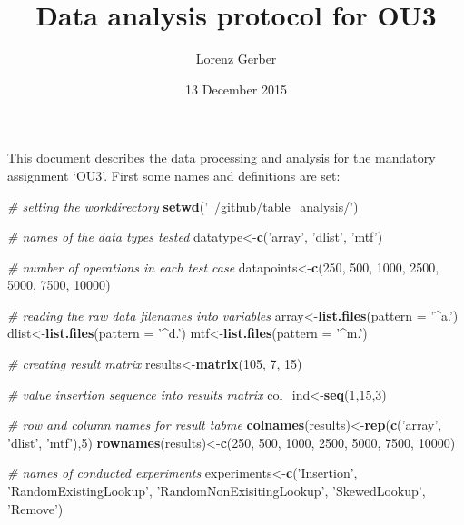 \documentclass[]{article}
\title{Data analysis protocol for OU3}
\author{Lorenz Gerber}
\date{13 December 2015}
\newenvironment{Shaded}{\begin{snugshade}}{\end{snugshade}}
\newcommand{\KeywordTok}[1]{\textcolor[rgb]{0.13,0.29,0.53}{\textbf{{#1}}}}
\newcommand{\DataTypeTok}[1]{\textcolor[rgb]{0.13,0.29,0.53}{{#1}}}
\newcommand{\DecValTok}[1]{\textcolor[rgb]{0.00,0.00,0.81}{{#1}}}
\newcommand{\StringTok}[1]{\textcolor[rgb]{0.31,0.60,0.02}{{#1}}}
\newcommand{\CommentTok}[1]{\textcolor[rgb]{0.56,0.35,0.01}{\textit{{#1}}}}
\newcommand{\NormalTok}[1]{{#1}}
\begin{document}
\maketitle


This document describes the data processing and analysis for the
mandatory assignment `OU3'. First some names and definitions are set:

\begin{Shaded}
\begin{Highlighting}[]
\CommentTok{# setting the workdirectory}
\KeywordTok{setwd}\NormalTok{(}\StringTok{'~/github/table_analysis/'}\NormalTok{)}

\CommentTok{# names of the data types tested}
\NormalTok{datatype<-}\KeywordTok{c}\NormalTok{(}\StringTok{'array'}\NormalTok{, }\StringTok{'dlist'}\NormalTok{, }\StringTok{'mtf'}\NormalTok{)}

\CommentTok{# number of operations in each test case}
\NormalTok{datapoints<-}\KeywordTok{c}\NormalTok{(}\DecValTok{250}\NormalTok{, }\DecValTok{500}\NormalTok{, }\DecValTok{1000}\NormalTok{, }\DecValTok{2500}\NormalTok{, }\DecValTok{5000}\NormalTok{, }\DecValTok{7500}\NormalTok{, }\DecValTok{10000}\NormalTok{)}

\CommentTok{# reading the raw data filenames into variables}
\NormalTok{array<-}\KeywordTok{list.files}\NormalTok{(}\DataTypeTok{pattern =} \StringTok{'^a.'}\NormalTok{)}
\NormalTok{dlist<-}\KeywordTok{list.files}\NormalTok{(}\DataTypeTok{pattern =} \StringTok{'^d.'}\NormalTok{)}
\NormalTok{mtf<-}\KeywordTok{list.files}\NormalTok{(}\DataTypeTok{pattern =} \StringTok{'^m.'}\NormalTok{)}

\CommentTok{# creating result matrix}
\NormalTok{results<-}\KeywordTok{matrix}\NormalTok{(}\DecValTok{105}\NormalTok{, }\DecValTok{7}\NormalTok{, }\DecValTok{15}\NormalTok{)}

\CommentTok{# value insertion sequence into results matrix}
\NormalTok{col_ind<-}\KeywordTok{seq}\NormalTok{(}\DecValTok{1}\NormalTok{,}\DecValTok{15}\NormalTok{,}\DecValTok{3}\NormalTok{)}

\CommentTok{# row and column names for result tabme}
\KeywordTok{colnames}\NormalTok{(results)<-}\KeywordTok{rep}\NormalTok{(}\KeywordTok{c}\NormalTok{(}\StringTok{'array'}\NormalTok{, }\StringTok{'dlist'}\NormalTok{, }\StringTok{'mtf'}\NormalTok{),}\DecValTok{5}\NormalTok{)}
\KeywordTok{rownames}\NormalTok{(results)<-}\KeywordTok{c}\NormalTok{(}\DecValTok{250}\NormalTok{, }\DecValTok{500}\NormalTok{, }\DecValTok{1000}\NormalTok{, }\DecValTok{2500}\NormalTok{, }\DecValTok{5000}\NormalTok{, }\DecValTok{7500}\NormalTok{, }\DecValTok{10000}\NormalTok{)}

\CommentTok{# names of conducted experiments}
\NormalTok{experiments<-}\KeywordTok{c}\NormalTok{(}\StringTok{'Insertion'}\NormalTok{, }\StringTok{'RandomExistingLookup'}\NormalTok{, }
               \StringTok{'RandomNonExisitingLookup'}\NormalTok{, }\StringTok{'SkewedLookup'}\NormalTok{, }\StringTok{'Remove'}\NormalTok{)}
\end{Highlighting}
\end{Shaded}
\end{document}
